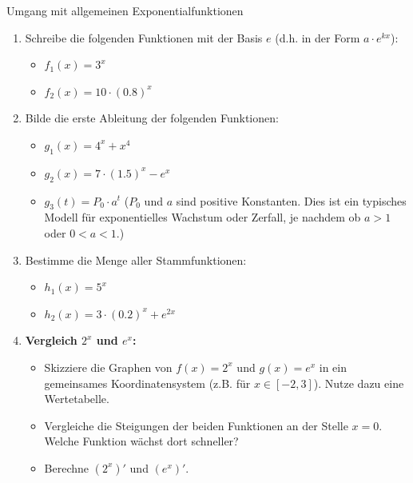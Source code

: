 \begin{aufgabenumgebung}{Umgang mit allgemeinen Exponentialfunktionen}
\begin{enumerate}
    \item Schreibe die folgenden Funktionen mit der Basis $e$ (d.h. in der Form $a \cdot e^{kx}$):
        \begin{itemize}
            \item $f_1(x) = 3^x$
            \item $f_2(x) = 10 \cdot (0.8)^x$
        \end{itemize}
    \item Bilde die erste Ableitung der folgenden Funktionen:
        \begin{itemize}
            \item $g_1(x) = 4^x + x^4$
            \item $g_2(x) = 7 \cdot (1.5)^x - e^x$
            \item $g_3(t) = P_0 \cdot a^t$ ($P_0$ und $a$ sind positive Konstanten. Dies ist ein typisches Modell für exponentielles Wachstum oder Zerfall, je nachdem ob $a>1$ oder $0<a<1$.)
        \end{itemize}
    \item Bestimme die Menge aller Stammfunktionen:
        \begin{itemize}
            \item $h_1(x) = 5^x$
            \item $h_2(x) = 3 \cdot (0.2)^x + e^{2x}$
        \end{itemize}
    \item \textbf{Vergleich $2^x$ und $e^x$:}
        \begin{itemize}
            \item Skizziere die Graphen von $f(x)=2^x$ und $g(x)=e^x$ in ein gemeinsames Koordinatensystem (z.B. für $x \in [-2, 3]$). Nutze dazu eine Wertetabelle.
            \item Vergleiche die Steigungen der beiden Funktionen an der Stelle $x=0$. Welche Funktion wächst dort schneller?
            \item Berechne $(2^x)'$ und $(e^x)'$.
        \end{itemize}
\end{enumerate}
\end{aufgabenumgebung}

